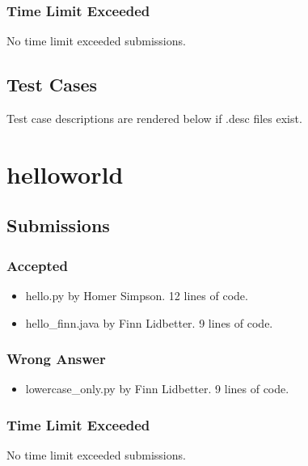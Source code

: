 \documentclass{article}%
\begin{document}
%
\subsubsection{Time Limit Exceeded}%
\label{ssubsec:TimeLimitExceeded}%
No time limit exceeded submissions.%

%
\subsection{Test Cases}%
\label{subsec:TestCases}%
Test case descriptions are rendered below if .desc files exist.%

%
\newpage%
\section{helloworld}%
\label{sec:helloworld}%
\subsection{Submissions}%
\label{subsec:Submissions}%
\subsubsection{Accepted}%
\label{ssubsec:Accepted}%
\begin{itemize}%
\item%
hello.py by Homer Simpson. 12 lines of code.%
\item%
hello\_finn.java by Finn Lidbetter. 9 lines of code.%
\end{itemize}

%
\subsubsection{Wrong Answer}%
\label{ssubsec:WrongAnswer}%
\begin{itemize}%
\item%
lowercase\_only.py by Finn Lidbetter. 9 lines of code.%
\end{itemize}

%
\subsubsection{Time Limit Exceeded}%
\label{ssubsec:TimeLimitExceeded}%
No time limit exceeded submissions.%

%
\end{document}
